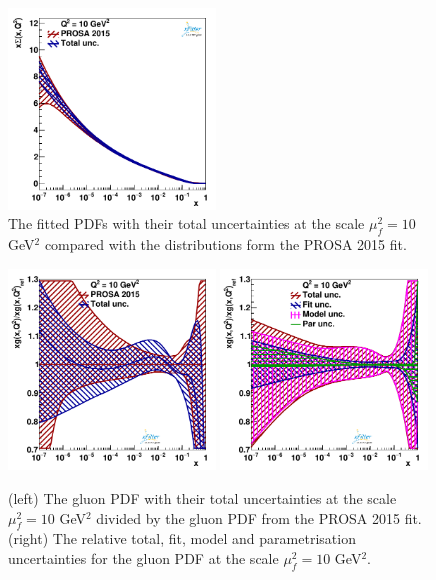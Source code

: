 \documentclass[12pt]{article}
\begin{document}
\begin{figure}
    \includegraphics[width=0.49\textwidth]{figs/q2_10_pdf_Sea.pdf}
    \caption{The fitted PDFs with their total uncertainties at the scale $\mu^2_f=10$ GeV$^2$ compared with the distributions form the PROSA 2015 fit.}
    \label{fig:pdfs}
\end{figure}

\begin{figure}
    \centering
    \includegraphics[width=0.49\textwidth]{figs/q2_10_pdf_g_ratio.pdf}
    \includegraphics[width=0.49\textwidth]{figs/gluonunc.pdf}
    \caption{(left) The gluon PDF with their total uncertainties at the scale $\mu^2_f=10$ GeV$^2$ divided by the gluon PDF from the PROSA 2015 fit. (right) The relative total, fit, model and parametrisation uncertainties for the gluon PDF at the scale $\mu^2_f=10$ GeV$^2$.}
    \label{fig:pdfratios}
\end{figure}
\end{document}
